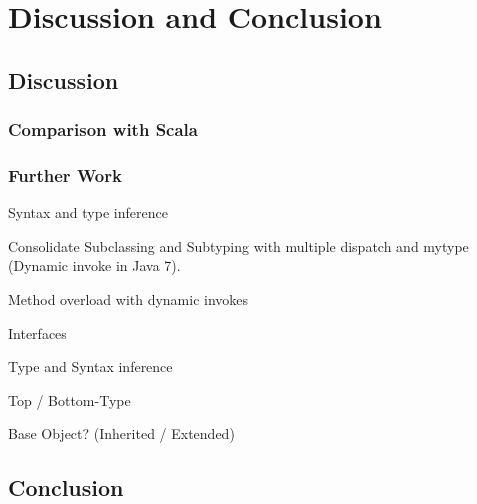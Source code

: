 \part{Discussion and Conclusion}
\chapter{Discussion}
\label{ctr:discussion}
\section{Comparison with Scala}
\label{sec:comparisonScala}

\section{Further Work}
\label{sec:furtherWork}
Syntax and type inference


Consolidate Subclassing and Subtyping with multiple dispatch and mytype (Dynamic invoke in Java 7).

Method overload with dynamic invokes

Interfaces

Type and Syntax inference

Top / Bottom-Type

Base Object? (Inherited / Extended)


\chapter{Conclusion}
\label{ctr:conclusion}
